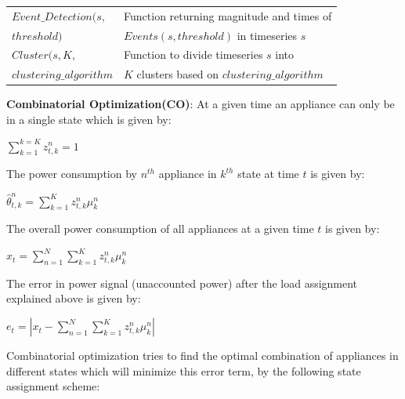 \documentclass[conference]{IEEEtran}
\begin{document}
\begin{table}[ht!]
\begin{tabular}{|l|l|}
\hline
$Event\_Detection(s,$ & Function returning magnitude and times of \\[0.1cm]
$threshold)$                  &$Events(s,threshold)$ in timeseries $s$\\[0.1cm]
\hline
$Cluster(s,K,$& Function to divide timeseries $s$ into\\[0.1cm]
$clustering\_algorithm$&$K$ clusters based on $clustering\_algorithm$ \\
\hline

                             
                                                                               

\hline
%
\end{tabular}
\end{table}

\noindent \textbf{Combinatorial Optimization(CO)}: At a given time an appliance can only be in a single state which is given by:

$\sum\limits_{k=1}^{k=K} z_{t,k}^n=1$ 

\noindent The power consumption by $n^{th}$ appliance in $k^{th}$ state at time $t$ is given by:

$\hat{\theta}^n_{t,k}=\sum\limits_{k=1}^{K} z_{t,k}^n \mu_k^n$

\noindent The overall power consumption of all appliances at a given time $t$ is given by:

$\hat{x}_{t}=\sum\limits_{n=1}^{N}\sum\limits_{k=1}^{K} z_{t,k}^n \mu_k^n$

\noindent The error in power signal (unaccounted power) after the load assignment explained above is given by:

$e_t=|x_t-\sum\limits_{n=1}^{N}\sum\limits_{k=1}^{K}z_{t,k}^n\mu_k^n|$

\noindent Combinatorial optimization tries to find the optimal combination of appliances in different states which will minimize this error term, by the following state assignment scheme:
\end{document}
